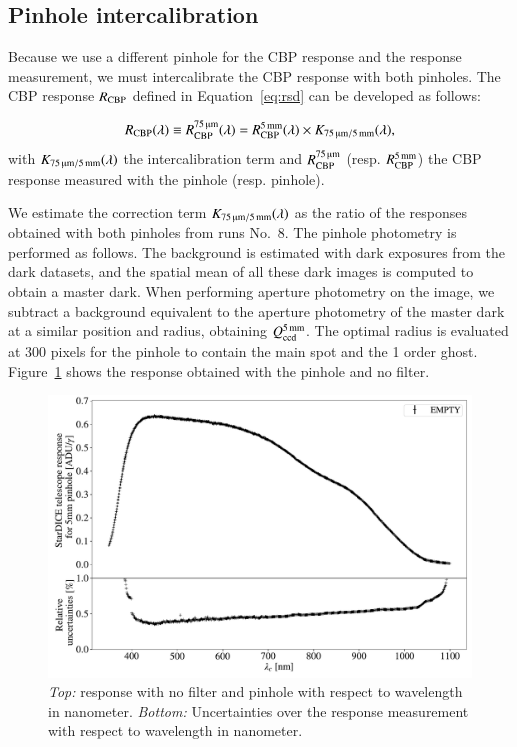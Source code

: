\subsection{Pinhole intercalibration}

Because we use a different pinhole for the CBP response and the \SD response measurement, we must intercalibrate the CBP response with both pinholes. The CBP response $R_{\mathrm{CBP}}$ defined in Equation~\ref{eq:rsd} can be developed as follows:

\begin{equation}
	R_{\mathrm{CBP}}(\lambda) \equiv R_{\mathrm{CBP}}^{\SI{75}{\micro\meter}}(\lambda) = R_{\mathrm{CBP}}^{\SI{5}{\milli\meter}}(\lambda) \times K_\mathrm{\SI{75}{\micro\meter}/\SI{5}{\milli\meter}}(\lambda),
\end{equation}
with $K_\mathrm{\SI{75}{\micro\meter}/\SI{5}{\milli\meter}}(\lambda)$ the intercalibration term and $R_{\mathrm{CBP}}^{\SI{75}{\micro\meter}}$ (resp. $R_{\mathrm{CBP}}^{\SI{5}{\milli\meter}}$) the CBP response measured with the \spinhole pinhole (resp. \bpinhole pinhole). 

We estimate the correction term $K_\mathrm{\SI{75}{\micro\meter}/\SI{5}{\milli\meter}}(\lambda)$ as the ratio of the \SD responses obtained with both pinholes from runs No.~8. The \bpinhole pinhole photometry is performed as follows. The background is estimated with dark exposures from the dark datasets, and the spatial mean of all these dark images is computed to obtain a master dark. When performing aperture photometry on the \bpinhole image, we subtract a background equivalent to the aperture photometry of the master dark at a similar position and radius, obtaining $Q_{\mathrm{ccd}}^{\SI{5}{\milli\meter}}$. The optimal radius is evaluated at 300 pixels for the \bpinhole pinhole to contain the main spot and the 1 order ghost. Figure~\ref{fig:stardice_5mm_response} shows the \SD response obtained with the \bpinhole pinhole and no filter. 


\begin{figure}[h]
    \centering
    \includegraphics[width=\columnwidth]{fig/stardice_5mm_response.pdf}
    \caption{\textit{Top:} \SD response with no filter and \bpinhole pinhole with respect to wavelength in nanometer. \textit{Bottom:} Uncertainties over the \SD response measurement with respect to wavelength in nanometer.}
    \label{fig:stardice_5mm_response}
\end{figure}

